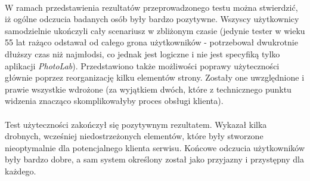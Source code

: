 \\
W ramach przedstawienia rezultatów przeprowadzonego testu można stwierdzić, iż ogólne odczucia badanych osób były bardzo pozytywne. Wszyscy użytkownicy samodzielnie ukończyli cały scenariusz w zbliżonym czasie (jedynie tester w wieku 55 lat rażąco odstawał od całego grona użytkowników - potrzebował dwukrotnie dłuższy czas niż najmłodsi, co jednak jest logiczne i nie jest specyfiką tylko aplikacji \textit{PhotoLab}). Przedstawiono także możliwości poprawy użyteczności głównie poprzez reorganizację kilku elementów strony. Zostały one uwzględnione i prawie wszystkie wdrożone (za wyjątkiem dwóch, które z technicznego punktu widzenia znacząco skomplikowałyby proces obsługi klienta).\\
\\
Test użyteczności zakończył się pozytywnym rezultatem. Wykazał kilka drobnych, wcześniej niedostrzeżonych elementów, które były stworzone nieoptymalnie dla potencjalnego klienta serwisu. Końcowe odczucia użytkowników były bardzo dobre, a sam system określony został jako przyjazny i przystępny dla każdego.

